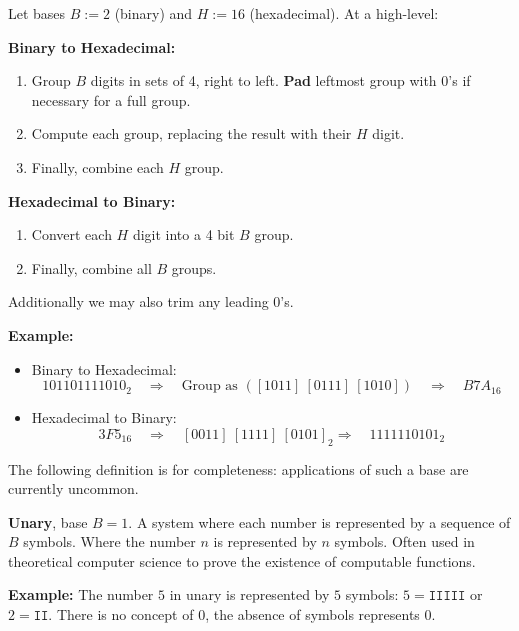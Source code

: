 \begin{theo}

    Let bases \( B:=2 \) (binary) and \( H:=16 \) (hexadecimal). At a high-level:

    \vspace{.5em}
    
    \noindent \textbf{Binary to Hexadecimal:}
    \begin{enumerate}
        \item Group $B$ digits in sets of 4, right to left. \textbf{Pad} leftmost group with 0's if necessary for a full group.
        \item Compute each group, replacing the result with their $H$ digit.
        \item Finally, combine each $H$ group.
    \end{enumerate}
    
    \noindent \textbf{Hexadecimal to Binary:}
    \begin{enumerate}
        \item Convert each $H$ digit into a 4 bit $B$ group.
        \item Finally, combine all $B$ groups.
    \end{enumerate}
    \noindent
    Additionally we may also trim any leading 0's.
\end{theo}

\newpage

\noindent
\textbf{Example:}
    \begin{itemize}
        \item Binary to Hexadecimal:
        \[
        101101111010_2 \quad \Rightarrow \quad \text{Group as } ([1011] \ [0111] \ [1010]) \quad \Rightarrow \quad B7A_{16}
        \]
        \item Hexadecimal to Binary:
        \[
        3F5_{16} \quad \Rightarrow \quad [0011]\ [1111]\ [0101]_2 \Rightarrow \quad 1111110101_2
        \]
        \noindent
    \end{itemize}
    \noindent
The following definition is for completeness: applications of such a base are currently uncommon.
\begin{Def}[Unary]
    
    \textbf{Unary}, base $B=1$. A system where each number is represented by a sequence of $B$ symbols. Where the number $n$ is represented by $n$ symbols. Often used in theoretical computer science to prove the existence of computable functions.
\end{Def}
\textbf{Example:} The number $5$ in unary is represented by $5$ symbols: $5 = \texttt{IIIII}$ or $2= \texttt{II}$. There is no concept of 0, the absence of symbols represents 0.\\